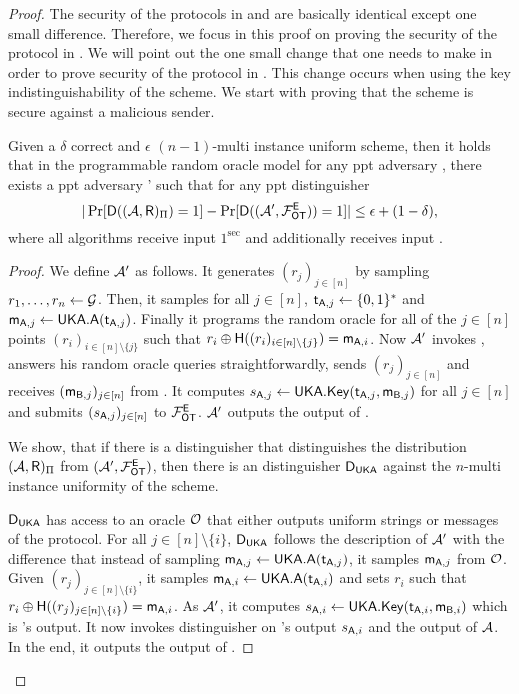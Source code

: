 \begin{proof}
The security of the protocols in  and  are basically identical except one small difference. Therefore, we focus in this proof on proving the security of the protocol in . We will point out the one small change that one needs to make in order to prove security of the protocol in . This change occurs when using the key indistinguishability of the \UKA scheme. 
We start with proving that the scheme is secure against a malicious sender. 
\begin{claim}\label{claim:malsender}
Given a $\delta$ correct and $\epsilon$ $(n-1)$-multi instance uniform \UKA scheme, then it holds that in the programmable random oracle model for any ppt adversary \Adv, there exists a ppt adversary \Adv' such that for any ppt distinguisher \D
$$
|\Pr[\mathsf D((\mathcal{A},\mathsf{R})_{\Pi})=1] -\Pr[\mathsf D( (\mathcal{A}', \mathcal{F}_{\mathsf{OT}}^\mathsf{E}))=1]|\leq \epsilon+(1-\delta),
$$
where all algorithms receive input $1^\sec$ and \rec additionally receives input \set.
\end{claim}

\begin{proof}
We define $\mathcal{A}'$ as follows. 
It generates $(r_j)_{j\in[n]}$ by sampling $r_1,\dots, r_n\leftarrow \mathcal{G}$. Then, it samples for all $j\in[n]$, $\mathsf{t}_{\mathsf{A},j}\leftarrow\{0,1\}^*$ and $\mathsf{m}_{\mathsf{A},j}\leftarrow\mathsf{UKA}.\mathsf{A}(\mathsf{t}_{\mathsf{A},j})$. Finally it programs the random oracle for all of the $j\in[n]$ points $(r_i)_{i\in[n]\setminus \{j\}}$ such that $r_i\oplus\mathsf{H}((r_i)_{i\in[n]\setminus \{j\}})=\mathsf{m}_{\mathsf{A},i}$. Now $\mathcal{A}'$ invokes \Adv, answers his random oracle queries straightforwardly, sends $(r_j)_{j\in[n]}$ and receives $(\mathsf{m}_{\mathsf{B},j})_{j\in[n]}$ from \Adv. It computes $s_{\mathsf{A},j}\leftarrow\mathsf{UKA}.\mathsf{Key}(\mathsf{t}_{\mathsf{A},j},\mathsf{m}_{\mathsf{B},j})$ for all $j\in[n]$ and submits $(s_{\mathsf{A},j})_{j\in [n]}$ to $\mathcal{F}_{\mathsf{OT}}^{\mathsf{E}}$. $\mathcal{A}'$ outputs the output of \Adv.

We show, that if there is a distinguisher \D that distinguishes the distribution $(\mathcal{A},\mathsf{R})_{\Pi}$ from $(\mathcal{A}',\mathcal{F}_{\mathsf{OT}}^{\mathsf{E}})$, then there is an distinguisher $\mathsf D_{\mathsf{UKA}}$ against the $n$-multi instance uniformity of the \UKA scheme. 

$\mathsf D_{\mathsf{UKA}}$ has access to an oracle $\mathcal{O}$ that either outputs uniform strings or messages of the \UKA protocol. For all $j\in[n]\setminus\{i\}$, $\mathsf D_{\mathsf{UKA}}$ follows the description of $\mathcal{A}'$ with the difference that instead of sampling  $\mathsf{m}_{\mathsf{A},j}\leftarrow\mathsf{UKA}.\mathsf{A}(\mathsf{t}_{\mathsf{A},j})$, it samples $\mathsf{m}_{\mathsf{A},j}$ from $\mathcal{O}$. Given $(r_j)_{j\in[n]\setminus\{i\}}$, it samples $\mathsf{m}_{\mathsf{A},i}\leftarrow\mathsf{UKA}.\mathsf{A}(\mathsf{t}_{\mathsf{A},i})$ and sets $r_i$ such that $r_i\oplus\mathsf{H}((r_j)_{j\in[n]\setminus \{i\}})=\mathsf{m}_{\mathsf{A},i}$. As $\mathcal{A}'$, it computes $s_{\mathsf{A},i}\leftarrow\mathsf{UKA}.\mathsf{Key}(\mathsf{t}_{\mathsf{A},i},\mathsf{m}_{\mathsf{B},i})$ which is \rec's output. It now invokes distinguisher \D on \rec's output $s_{\mathsf{A},i}$ and the output of $\mathcal{A}$. In the end, it outputs the output of \D.



\end{proof}
\end{proof}
